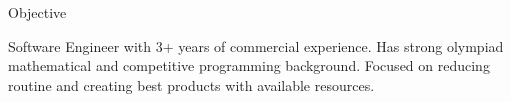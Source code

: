 \begin{rSection}{Objective}

    Software Engineer with 3+ years of commercial experience.
    Has strong olympiad mathematical and competitive programming background.
    Focused on reducing routine and creating best products with available resources.

\end{rSection}
